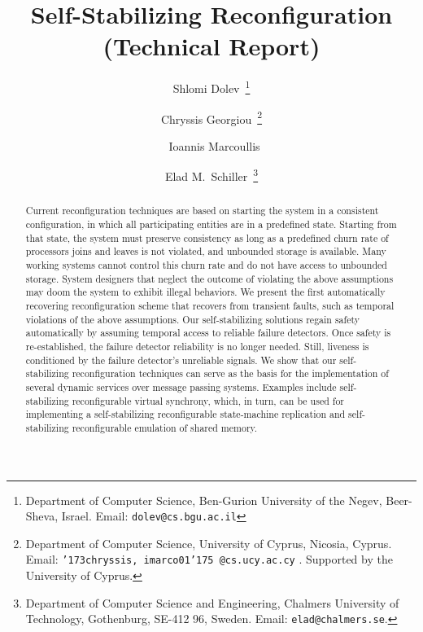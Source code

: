 \documentclass[11pt]{article}
\begin{document}
\begin{titlepage}
\renewcommand{\thefootnote}{\fnsymbol{footnote}}



\title{Self-Stabilizing Reconfiguration\\ \large{(Technical Report)}
}



\author{Shlomi Dolev~\footnote{Department of Computer Science, Ben-Gurion University of the Negev, Beer-Sheva, Israel. Email: {\tt dolev@cs.bgu.ac.il} }
\and Chryssis Georgiou~\footnote{ Department of Computer Science, University of Cyprus, Nicosia, Cyprus. Email: {\tt {\char '173}chryssis, imarco01{\char '175} @cs.ucy.ac.cy} . Supported by the University of Cyprus.} \and~Ioannis Marcoullis \and Elad M.\ Schiller~\footnote{Department of Computer Science and Engineering, Chalmers University of Technology, Gothenburg, SE-412 96, Sweden. Email: {\tt elad@chalmers.se}.}}

\date{}

\maketitle

\thispagestyle{empty}




\begin{abstract}
Current reconfiguration techniques are based on starting the system in a consistent configuration, in which all participating entities are in a predefined state. Starting from that state, the system must preserve consistency as long as a predefined churn rate of processors joins and leaves is not violated, and unbounded storage is available.
Many working systems cannot control this churn rate and do not have access to unbounded storage. System designers that neglect the outcome of violating the above assumptions may doom the system to exhibit illegal behaviors. We present the first automatically recovering reconfiguration scheme that recovers from transient faults, such as temporal violations of the above assumptions. Our self-stabilizing solutions regain safety automatically by assuming temporal access to reliable failure detectors. Once safety is re-established, the failure detector reliability is no longer needed. Still, liveness is conditioned by the failure detector's unreliable signals. We show
that our self-stabilizing reconfiguration techniques can serve as the basis for the
implementation of several dynamic services over message passing systems. 
Examples include  
self-stabilizing reconfigurable virtual synchrony, which, in turn, can be used for implementing a self-stabilizing  
reconfigurable state-machine replication and self-stabilizing reconfigurable emulation of shared memory.
\vspace{2em}


\end{abstract}
\end{titlepage}
\end{document}
